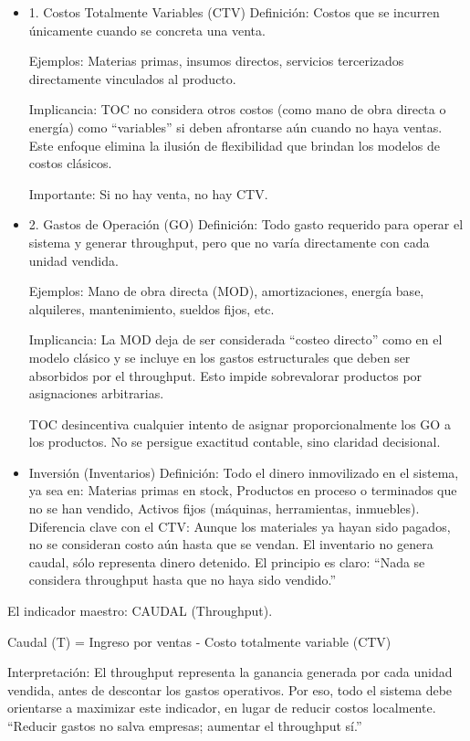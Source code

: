 \documentclass[a4paper,oneside,11pt]{article}
\begin{document}
\begin{itemize}
    \item 1. Costos Totalmente Variables (CTV)
    Definición: Costos que se incurren únicamente cuando se concreta una venta.
    
    Ejemplos: Materias primas, insumos directos, servicios tercerizados directamente vinculados al producto.
    
    Implicancia: TOC no considera otros costos (como mano de obra directa o energía) como “variables” si deben afrontarse aún cuando no haya ventas. Este enfoque elimina la ilusión de flexibilidad que brindan los modelos de costos clásicos.
    
    Importante: Si no hay venta, no hay CTV.

    \item 2. Gastos de Operación (GO)
    Definición: Todo gasto requerido para operar el sistema y generar throughput, pero que no varía directamente con cada unidad vendida.
    
    Ejemplos: Mano de obra directa (MOD), amortizaciones, energía base, alquileres, mantenimiento, sueldos fijos, etc.
    
    Implicancia: La MOD deja de ser considerada “costeo directo” como en el modelo clásico y se incluye en los gastos estructurales que deben ser absorbidos por el throughput. Esto impide sobrevalorar productos por asignaciones arbitrarias.
    
    TOC desincentiva cualquier intento de asignar proporcionalmente los GO a los productos. No se persigue exactitud contable, sino claridad decisional.

    \item Inversión (Inventarios)
    Definición: Todo el dinero inmovilizado en el sistema, ya sea en: Materias primas en stock, Productos en proceso o terminados que no se han vendido, Activos fijos (máquinas, herramientas, inmuebles).
    Diferencia clave con el CTV: Aunque los materiales ya hayan sido pagados, no se consideran costo aún hasta que se vendan. El inventario no genera caudal, sólo representa dinero detenido.
    El principio es claro: “Nada se considera throughput hasta que no haya sido vendido.”

\end{itemize}

El indicador maestro: CAUDAL (Throughput).

Caudal (T) = Ingreso por ventas - Costo totalmente variable (CTV)

Interpretación: El throughput representa la ganancia generada por cada unidad vendida, antes de descontar los gastos operativos. Por eso, todo el sistema debe orientarse a maximizar este indicador, en lugar de reducir costos localmente. “Reducir gastos no salva empresas; aumentar el throughput sí.”
\end{document}
